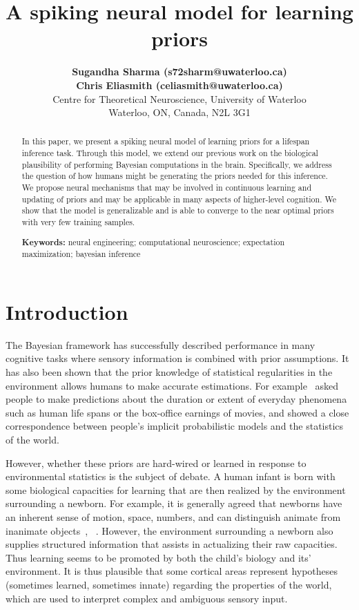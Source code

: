 \documentclass[10pt,letterpaper]{article}
\title{A spiking neural model for learning priors}
\author{{\large \bf Sugandha Sharma (s72sharm@uwaterloo.ca)} \\
  {\large \bf Chris Eliasmith (celiasmith@uwaterloo.ca)} \\
  Centre for Theoretical Neuroscience, University of Waterloo \\
  Waterloo, ON, Canada, N2L 3G1}
\begin{document}
\maketitle

\begin{abstract}
In this paper, we present a spiking neural model of learning priors for a lifespan inference task. Through this model, we extend our previous work on the biological plausibility of performing Bayesian computations in the brain. Specifically, we address the 
question of how humans might be generating the priors needed for this inference. We propose neural mechanisms that may be involved in continuous learning and updating of priors and may be applicable in many aspects of higher-level cognition. We show that the model is generalizable and is able to converge to the near optimal priors with very few training samples. 

\textbf{Keywords:} 
neural engineering; computational neuroscience; expectation maximization; bayesian inference
\end{abstract}

\section{Introduction}

The Bayesian framework has successfully described performance in many cognitive tasks where sensory information is combined with prior assumptions. It has also been shown that the prior knowledge of statistical regularities in the environment allows humans to make accurate estimations. For example~ asked people to make predictions about the duration or extent of everyday phenomena such as human life spans or the box-office earnings of movies, and showed a close correspondence between people’s implicit probabilistic models and the statistics of the world. 

However, whether these priors are hard-wired or learned in response to environmental statistics is the subject of debate. A human infant is born with some biological capacities for learning that are then realized by the environment surrounding a newborn. For example, it is generally agreed that newborns have an inherent sense of motion, space, numbers, and can distinguish animate from inanimate objects~\cite{spelke2007core}, ~\cite{izard2009newborn}. However, the environment surrounding a newborn also supplies structured information that assists in actualizing their raw capacities. Thus learning seems to be promoted by both the child's biology and its' environment. It is thus plausible that some cortical areas represent hypotheses (sometimes learned, sometimes innate) regarding the properties of the world, which are used to interpret complex and ambiguous sensory input.
\end{document}
